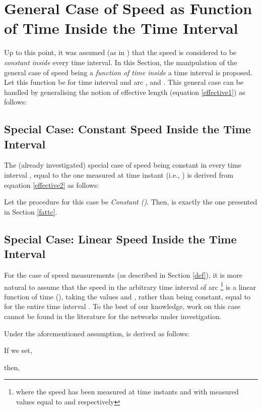 \documentclass[conference]{IEEEtran}
\begin{document}
\section{General Case of Speed as Function of Time Inside the Time Interval} \label{general}

Up to this point, it was assumed (as in \cite{Sung}) that the speed is considered to be \emph{constant inside} every time interval. In this Section, the manipulation of the general case of speed being a \emph{function of time inside} a time interval is proposed. Let this function be  for time interval  and arc , and . This general case can be handled by generalising the notion of effective length  (equation \ref{effective1}) as follows: 



\subsection{Special Case: Constant Speed Inside the Time Interval} 

The (already investigated) special case of speed being constant in every time interval , equal to the one measured at time instant  (i.e., ) is derived from equation \ref{effective2} as follows:



Let the  procedure for this case be \emph{Constant  ()}. Then,  is exactly the one presented in Section \ref{fattc}. 

\subsection{Special Case: Linear Speed Inside the Time Interval} 

For the case of speed measurements (as described in Section \ref{def}), it is more natural to assume that the speed in the arbitrary time interval  of arc \footnote{where the speed has been measured at time instants  and  with measured values equal to  and  respectively} is a linear function of time (), taking the values  and , rather than being constant, equal to  for the entire time interval . To the best of our knowledge, work on this case cannot be found in the literature for the networks under investigation.

Under the aforementioned assumption,  is derived as follows:




If we set, 



then, 
\end{document}
